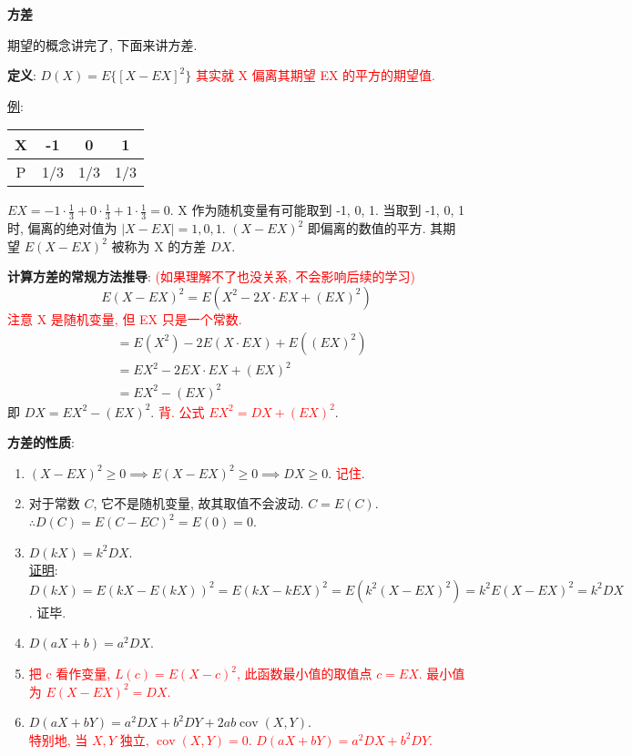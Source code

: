 \documentclass[padp]{ExBook}
\DeclareMathOperator{\cov}{cov}
\begin{document}
\hrulefill
\vspace{1em}

\textbf{方差}
\vspace{1em}

期望的概念讲完了, 下面来讲方差.

\textbf{定义}: $D(X) = E\{[X-EX]^2\}$
\textcolor{red}{其实就 X 偏离其期望 EX 的平方的期望值.}

\underline{例}:
\begin{center}
\begin{tabular}{|c|c|c|c|}
\hline
X & -1 & 0 & 1 \\
\hline
P & 1/3 & 1/3 & 1/3 \\
\hline
\end{tabular}
\end{center}
$EX = -1 \cdot \frac{1}{3} + 0 \cdot \frac{1}{3} + 1 \cdot \frac{1}{3} = 0$.
X 作为随机变量有可能取到 -1, 0, 1.
当取到 -1, 0, 1 时, 偏离的绝对值为 $|X-EX|=1, 0, 1$.
$(X-EX)^2$ 即偏离的数值的平方.
其期望 $E(X-EX)^2$ 被称为 X 的方差 $DX$.

\vspace{1em}
\textbf{计算方差的常规方法推导}:
\textcolor{red}{(如果理解不了也没关系, 不会影响后续的学习)}
$$ E(X-EX)^2 = E(X^2 - 2X \cdot EX + (EX)^2) $$
\textcolor{red}{注意 X 是随机变量, 但 EX 只是一个常数.}
\begin{align*}
    &= E(X^2) - 2E(X \cdot EX) + E((EX)^2) \\
    &= EX^2 - 2EX \cdot EX + (EX)^2 \\
    &= EX^2 - (EX)^2
\end{align*}
即 $DX = EX^2 - (EX)^2$.
\textcolor{red}{背. 公式 $EX^2 = DX + (EX)^2$}.

\vspace{1em}
\textbf{方差的性质}:
\begin{enumerate}[label=(\arabic*), itemsep=3pt]
    \item $(X-EX)^2 \ge 0 \implies E(X-EX)^2 \ge 0 \implies DX \ge 0$. \textcolor{red}{记住}.
    \item 对于常数 $C$, 它不是随机变量, 故其取值不会波动. $C=E(C)$.
    $\therefore D(C) = E(C-EC)^2 = E(0) = 0$.
    \item $D(kX) = k^2 DX$. \\
    \underline{证明}: $D(kX) = E(kX-E(kX))^2 = E(kX-kEX)^2 = E(k^2(X-EX)^2) = k^2 E(X-EX)^2 = k^2DX$. 证毕.
    \item $D(aX+b) = a^2 DX$.
    \item \textcolor{red}{把 c 看作变量, $L(c)=E(X-c)^2$, 此函数最小值的取值点 $c=EX$. 最小值为 $E(X-EX)^2 = DX$.}
    \item $D(aX+bY) = a^2DX + b^2DY + 2ab\cov(X,Y)$. \\
    \textcolor{red}{特别地, 当 $X,Y$ 独立, $\cov(X,Y)=0$. $D(aX+bY) = a^2DX+b^2DY$.}
\end{enumerate}
\end{document}
